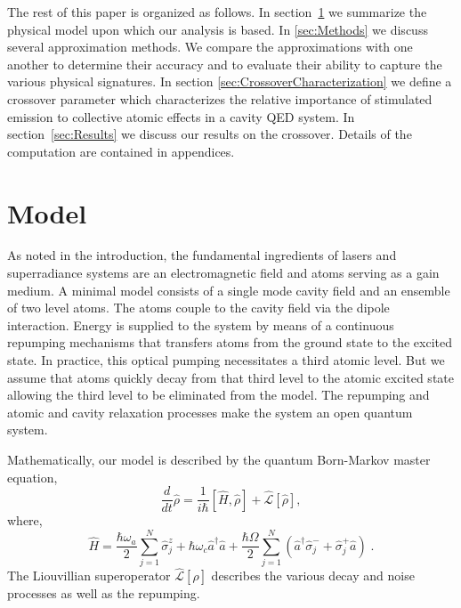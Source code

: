 \documentclass[aps,
twocolumn,
superscriptaddress,groupedaddress]{revtex4}
\begin{document}
The rest of this paper is organized as follows.  In
section~\ref{sec:Model} we summarize the physical model upon which our
analysis is based. In \ref{sec:Methods} we discuss several approximation
methods.  We compare the approximations with one another to determine
their accuracy and to evaluate their ability to capture the various
physical signatures. In section \ref{sec:CrossoverCharacterization} we
define a crossover parameter which characterizes the relative importance
of stimulated emission to collective atomic effects in a cavity QED
system.  In section~\ref{sec:Results} we discuss our results on the
crossover.  Details of the computation are contained in appendices.


\section{Model}
\label{sec:Model}

As noted in the introduction, the fundamental ingredients of lasers and
superradiance systems are an electromagnetic field and atoms serving as
a gain medium.  A minimal model consists of a single mode cavity field
and an ensemble of two level atoms.  The atoms couple to the
cavity field via the dipole interaction.  Energy is supplied to the
system by means of a continuous repumping mechanisms that transfers
atoms from the ground state to the excited state.  In practice, this
optical pumping necessitates a third atomic level.  But we assume that
atoms quickly decay from that third level to the atomic excited state
allowing the third level to be eliminated from the model.  The
repumping and atomic and cavity relaxation processes make the system an
open quantum system.

Mathematically, our model is described by the quantum Born-Markov master
equation,
\begin{equation}
  \frac{d}{dt} \hat{\rho} =
  \frac{1}{i \hbar} \left[ \hat{H}, \hat{\rho} \right] +
  \hat{\mathcal{L}}\left[ \hat{\rho} \right],
\label{ME1Crossover}
\end{equation}
where,
\begin{equation}
\hat{H} = \frac{\hbar \omega_a}{2} \sum_{j=1}^{N} \hat{\sigma}^{z}_{j}
+ \hbar \omega_c \hat{a}^{\dagger}\hat{a}
+ \frac{\hbar \Omega}{2}  \sum_{j=1}^{N} \left(
    \hat{a}^{\dagger} \hat{\sigma}^{-}_{j} +
    \hat{\sigma}^{+}_{j} \hat{a} \right)\;.
\end{equation}
The Liouvillian superoperator $\hat{\mathcal{L}}\left[ \hat{\rho}
\right]$ describes the various decay and noise processes as well as the
repumping.
\end{document}
